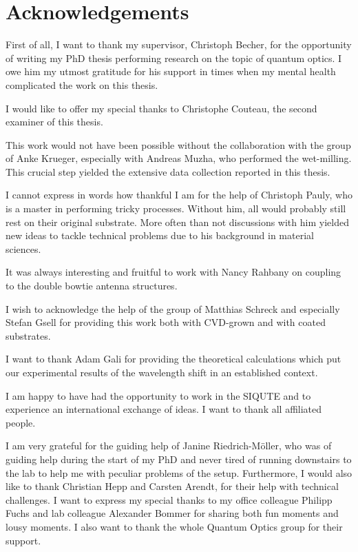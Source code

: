 

\null\vfill
\section*{Acknowledgements}
	
	First of all, I want to thank my supervisor, Christoph Becher, for the opportunity of writing my PhD thesis performing research on the topic of quantum optics. 
	I owe him my utmost gratitude for his support in times when my mental health complicated the work on this thesis.

	I would like to offer my special thanks to Christophe Couteau, the second examiner of this thesis. 

	This work would not have been possible without the collaboration with the group of Anke Krueger, especially with Andreas Muzha, who performed the wet-milling. 
	This crucial step yielded the extensive data collection reported in this thesis.

	I cannot express in words how thankful I am for the help of Christoph Pauly, who is a master in performing tricky \pp processes. Without him, all \nds would probably still rest on their original substrate. 
	More often than not discussions with him yielded new ideas to tackle technical problems due to his background in material sciences.

	It was always interesting and fruitful to work with Nancy Rahbany on coupling \nds to the double bowtie antenna structures. 

	I wish to acknowledge the help of the group of Matthias Schreck and especially Stefan Gsell for providing this work both with CVD-grown \nds and with \ir coated substrates.

	I want to thank Adam Gali for providing the theoretical calculations which put our experimental results of the wavelength shift in an established context.

	I am happy to have had the opportunity to work in the SIQUTE and to experience an international exchange of ideas. I want to thank all affiliated people.

	I am very grateful for the guiding help of Janine Riedrich-Möller, who was of guiding help during the start of my PhD and never tired of running downstairs to the lab to help me with peculiar problems of the setup. 
	Furthermore, I would also like to thank Christian Hepp and Carsten Arendt, for their help with technical challenges. 
	I want to express my special thanks to my office colleague Philipp Fuchs and lab colleague Alexander Bommer for sharing both fun moments and lousy moments.
	I also want to thank the whole Quantum Optics group for their support.


